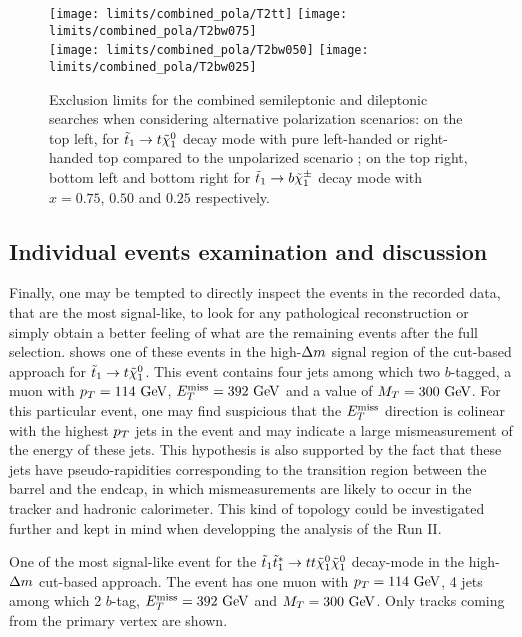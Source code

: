     \begin{figure}[h!]
        \centering
        \texttt{[image: limits/combined\_pola/T2tt]}
        \texttt{[image: limits/combined\_pola/T2bw075]}\\
        \texttt{[image: limits/combined\_pola/T2bw050]}
        \texttt{[image: limits/combined\_pola/T2bw025]}\\
        \caption{Exclusion limits for the combined semileptonic and dileptonic searches
        when considering alternative polarization scenarios: on the top left, for $\tilde{t}_1
        \rightarrow t \tilde{\chi}_1^0$ decay mode with pure left-handed or right-handed top
        compared to the unpolarized scenario ; on the top right, bottom left and bottom
        right for $\tilde{t}_1 \rightarrow b \tilde{\chi}_1^\pm$ decay mode with $x=0.75$, $0.50$ and
        $0.25$ respectively.}
        \label{fig:resultsCombinedPolarized}
    \end{figure}

    \subsection{Individual events examination and discussion}

    Finally, one may be tempted to directly inspect the events in the recorded data, that are the
    most signal-like, to look for any pathological reconstruction or simply obtain a
    better feeling of what are the remaining events after the full selection. 
    shows one of these events in the high-$\Delta m$ signal region of the cut-based approach
    for $\tilde{t}_1 \rightarrow t \tilde{\chi}_1^0$. This event contains four jets among which
    two $b$-tagged, a muon with $p_T = 114~\text{GeV}$, $E_T^\text{miss} = 392~\text{GeV}$ and a value of $M_T =
    300~\text{GeV}$. For this particular event, one may find suspicious that the $E_T^\text{miss}$ direction
    is colinear with the highest $p_T$ jets in the event and may indicate a large mismeasurement
    of the energy of these jets. This hypothesis is also supported by the fact that these
    jets have pseudo-rapidities corresponding to the transition region between the barrel
    and the endcap, in which mismeasurements are likely to occur in the tracker and hadronic
    calorimeter. This kind of topology could be investigated further and kept in mind when
    developping the analysis of the Run II.

    {One of the most signal-like event for the $\tilde{t}_1 \tilde{t}_1^{*} \rightarrow t t \tilde{\chi}_1^0 \tilde{\chi}_1^0$
    decay-mode in the high-$\Delta m$ cut-based approach. The event has one muon with
    $p_T = 114~\text{GeV}$, 4 jets among which 2 $b$-tag, $E_T^\text{miss} = 392~\text{GeV}$ and $M_T = 300 ~\text{GeV}$.
    Only tracks coming from the primary vertex are shown.}

